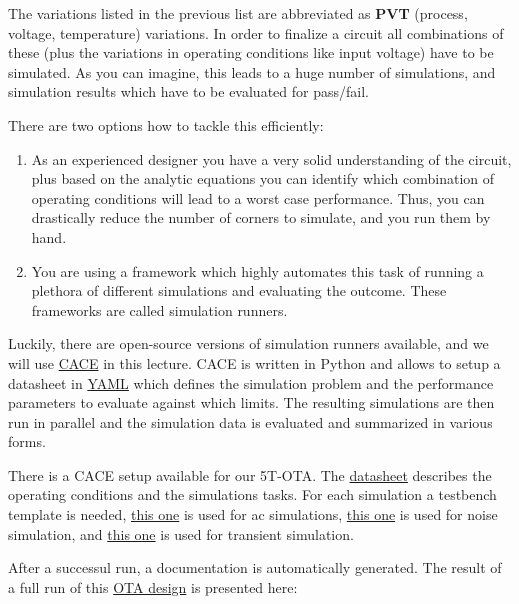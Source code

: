 \documentclass[
  a4paper,
  DIV=11,
  numbers=noendperiod]{scrartcl}
\providecommand{\tightlist}{%
  \setlength{\itemsep}{0pt}\setlength{\parskip}{0pt}}\usepackage{longtable,booktabs,array}
\begin{document}
The variations listed in the previous list are abbreviated as
\textbf{PVT} (process, voltage, temperature) variations. In order to
finalize a circuit all combinations of these (plus the variations in
operating conditions like input voltage) have to be simulated. As you
can imagine, this leads to a huge number of simulations, and simulation
results which have to be evaluated for pass/fail.

There are two options how to tackle this efficiently:

\begin{enumerate}
\def\labelenumi{\arabic{enumi}.}
\tightlist
\item
  As an experienced designer you have a very solid understanding of the
  circuit, plus based on the analytic equations you can identify which
  combination of operating conditions will lead to a worst case
  performance. Thus, you can drastically reduce the number of corners to
  simulate, and you run them by hand.
\item
  You are using a framework which highly automates this task of running
  a plethora of different simulations and evaluating the outcome. These
  frameworks are called simulation runners.
\end{enumerate}

Luckily, there are open-source versions of simulation runners available,
and we will use \href{https://github.com/efabless/cace}{CACE} in this
lecture. CACE is written in Python and allows to setup a datasheet in
\href{https://yaml.org}{YAML} which defines the simulation problem and
the performance parameters to evaluate against which limits. The
resulting simulations are then run in parallel and the simulation data
is evaluated and summarized in various forms.

There is a CACE setup available for our 5T-OTA. The
\href{./cace/voltage-buffer-ota.yaml}{datasheet} describes the operating
conditions and the simulations tasks. For each simulation a testbench
template is needed, \href{./cace/templates/ota-5t-ac.sch}{this one} is
used for ac simulations, \href{./cace/templates/ota-5t-noise.sch}{this
one} is used for noise simulation, and
\href{./cace/templates/ota-5t-tran.sch}{this one} is used for transient
simulation.

After a successul run, a documentation is automatically generated. The
result of a full run of this \href{./xschem/ota-5t.svg}{OTA design} is
presented here:
\end{document}
